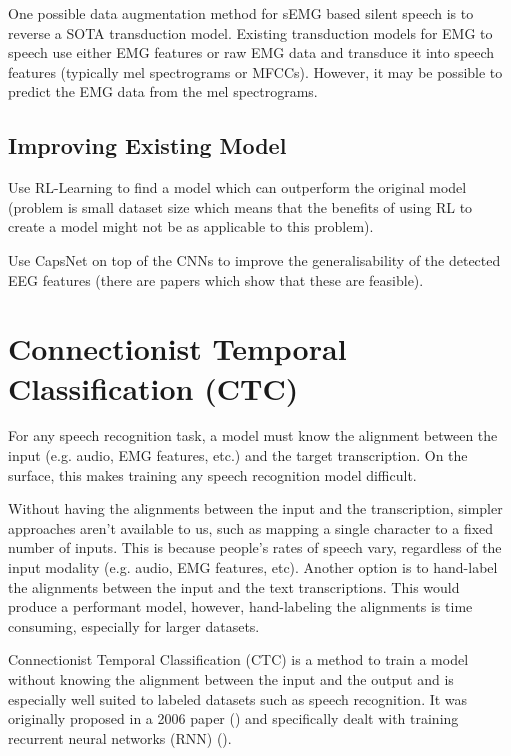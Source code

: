 One possible data augmentation method for sEMG based silent speech is to
reverse a SOTA transduction model. Existing transduction models for
EMG to speech use either EMG features or raw EMG data and transduce
it into speech features (typically mel spectrograms or MFCCs). However,
it may be possible to predict the EMG data from the mel spectrograms.

\subsection{Improving Existing Model}

Use RL-Learning to find a model which can outperform the original model
(problem is small dataset size which means that the benefits of using RL
to create a model might not be as applicable to this problem).

Use CapsNet on top of the CNNs to improve the generalisability of the
detected EEG features (there are papers which show that these are
feasible).

\section{Connectionist Temporal Classification (CTC)}

For any speech recognition task, a model must know the alignment
between the input (e.g. audio, EMG features, etc.) and the target
transcription. On the surface, this makes training any speech
recognition model difficult.

Without having the alignments between the input and the transcription,
simpler approaches aren't available to us, such as mapping a single
character to a fixed number of inputs. This is because people's rates
of speech vary, regardless of the input modality (e.g. audio, EMG features,
etc). Another option is to hand-label the alignments between the input
and the text transcriptions. This would produce a performant model, however,
hand-labeling the alignments is time consuming, especially for larger datasets.

Connectionist Temporal Classification (CTC) is a method to train a model
without knowing the alignment between the input and the output and is especially
well suited to labeled datasets such as speech recognition.
It was originally proposed in a 2006 paper (\cite{ctc_original}) and specifically
dealt with training recurrent neural networks (RNN) (\cite{rnn_fundamentals}).
